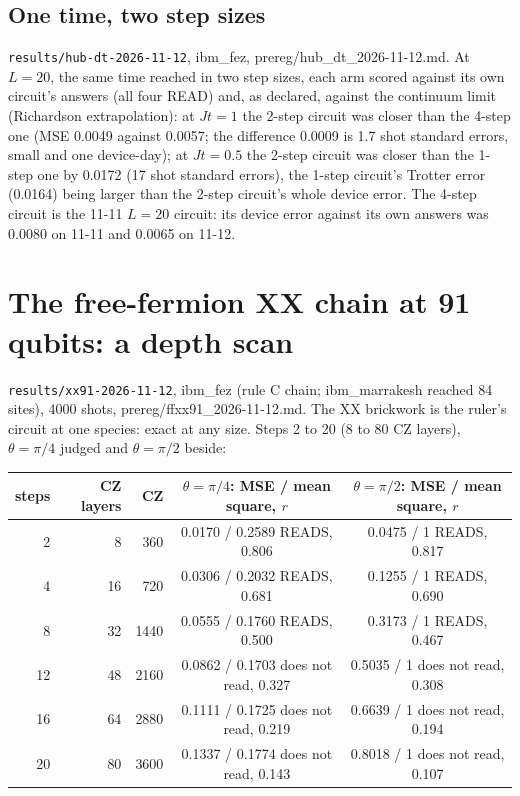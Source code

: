 \subsection{One time, two step sizes}
\texttt{results/hub-dt-2026-11-12}, ibm\_fez, prereg/hub\_dt\_2026-11-12.md. At $L = 20$, the same time reached in two
step sizes, each arm scored against its own circuit's answers (all four READ) and, as declared, against the continuum
limit (Richardson extrapolation): at $Jt = 1$ the 2-step circuit was closer than the 4-step one (MSE 0.0049 against
0.0057; the difference 0.0009 is 1.7 shot standard errors, small and one device-day); at $Jt = 0.5$ the 2-step circuit
was closer than the 1-step one by 0.0172 (17 shot standard errors), the 1-step circuit's Trotter error (0.0164) being
larger than the 2-step circuit's whole device error. The 4-step circuit is the 11-11 $L = 20$ circuit: its device error
against its own answers was 0.0080 on 11-11 and 0.0065 on 11-12.

\section{The free-fermion XX chain at 91 qubits: a depth scan}\label{sec:xx91}
\texttt{results/xx91-2026-11-12}, ibm\_fez (rule C chain; ibm\_marrakesh reached 84 sites), 4000 shots,
prereg/ffxx91\_2026-11-12.md. The XX brickwork is the ruler's circuit at one species: exact at any size. Steps 2 to 20
(8 to 80 CZ layers), $\theta = \pi/4$ judged and $\theta = \pi/2$ beside:

\begin{center}\small
\begin{tabular}{rrrcc}
\hline
steps & CZ layers & CZ & $\theta=\pi/4$: MSE / mean square, $r$ & $\theta=\pi/2$: MSE / mean square, $r$ \\
\hline
2 & 8 & 360 & 0.0170 / 0.2589 READS, 0.806 & 0.0475 / 1 READS, 0.817 \\
4 & 16 & 720 & 0.0306 / 0.2032 READS, 0.681 & 0.1255 / 1 READS, 0.690 \\
8 & 32 & 1440 & 0.0555 / 0.1760 READS, 0.500 & 0.3173 / 1 READS, 0.467 \\
12 & 48 & 2160 & 0.0862 / 0.1703 does not read, 0.327 & 0.5035 / 1 does not read, 0.308 \\
16 & 64 & 2880 & 0.1111 / 0.1725 does not read, 0.219 & 0.6639 / 1 does not read, 0.194 \\
20 & 80 & 3600 & 0.1337 / 0.1774 does not read, 0.143 & 0.8018 / 1 does not read, 0.107 \\
\hline
\end{tabular}
\end{center}

